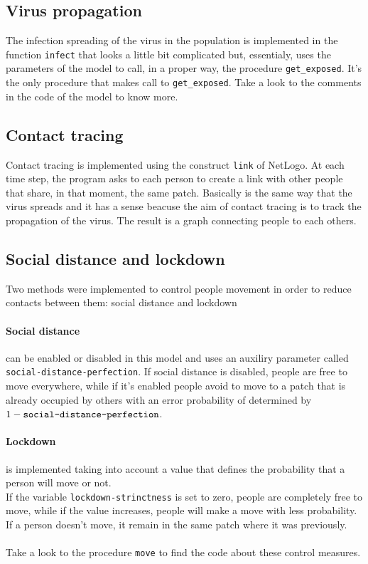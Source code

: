 \documentclass[12pt]{llncs}
\begin{document}
\subsection{Virus propagation}
The infection spreading of the virus in the population is implemented in the function \texttt{infect} that looks a little bit complicated but, essentialy, uses the parameters of the model to call, in a proper way, the procedure \texttt{get\_exposed}. It's the only procedure that makes call to \texttt{get\_exposed}. Take a look to the comments in the code of the model to know more.

\subsection{Contact tracing}
Contact tracing is implemented using the construct \texttt{link} of NetLogo. At each time step, the program asks to each person to create a link with other people that share, in that moment, the same patch. Basically is the same way that the virus spreads and it has a sense beacuse the aim of contact tracing is to track the propagation of the virus. The result is a graph connecting people to each others.

\subsection{Social distance and lockdown}
Two methods were implemented to control people movement in order to reduce contacts between them: social distance and lockdown
\paragraph{Social distance} can be enabled or disabled in this model and uses an auxiliry parameter called \texttt{social-distance-perfection}. If social distance is disabled, people are free to move everywhere, while if it's enabled people avoid to move to a patch that is already occupied by others with an error probability of determined by $1 - \textrm{\texttt{social-distance-perfection}}$.
\paragraph{Lockdown} is implemented taking into account a value that defines the probability that a person will move or not. \\
If the variable \texttt{lockdown-strinctness} is set to zero, people are completely free to move, while if the value increases, people will make a move with less probability. If a person doesn't move, it remain in the same patch where it was previously.\\ \\
Take a look to the procedure \texttt{move} to find the code about these control measures.
\end{document}
